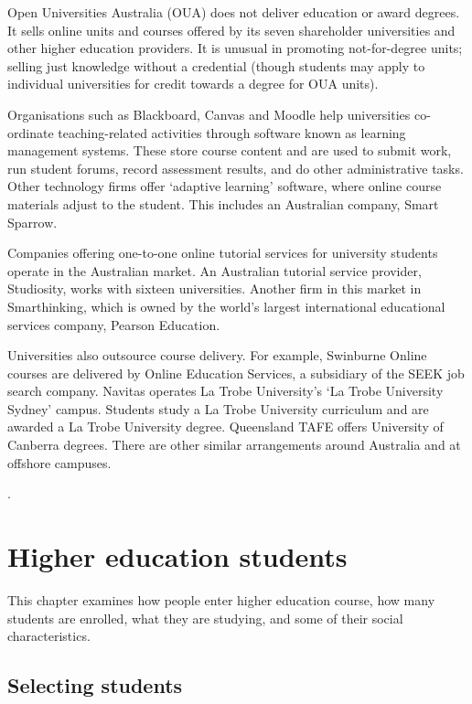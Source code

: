 \documentclass[]{book}
\begin{document}
Open Universities Australia (OUA) does not deliver education or award degrees. It sells online units and courses offered by its seven shareholder universities and other higher education providers. It is unusual in promoting not-for-degree units; selling just knowledge without a credential (though students may apply to individual universities for credit towards a degree for OUA units).

Organisations such as Blackboard, Canvas and Moodle help universities co-ordinate teaching-related activities through software known as learning management systems. These store course content and are used to submit work, run student forums, record assessment results, and do other administrative tasks. Other technology firms offer `adaptive learning' software, where online course materials adjust to the student. This includes an Australian company, Smart Sparrow.

Companies offering one-to-one online tutorial services for university students operate in the Australian market. An Australian tutorial service provider, Studiosity, works with sixteen universities. Another firm in this market in Smarthinking, which is owned by the world's largest international educational services company, Pearson Education.

Universities also outsource course delivery. For example, Swinburne Online courses are delivered by Online Education Services, a subsidiary of the SEEK job search company. Navitas operates La Trobe University's `La Trobe University Sydney' campus. Students study a La Trobe University curriculum and are awarded a La Trobe University degree. Queensland TAFE offers University of Canberra degrees. There are other similar arrangements around Australia and at offshore campuses.

.

\hypertarget{higher-education-students}{%
\chapter{Higher education students }\label{higher-education-students}}

This chapter examines how people enter higher education course, how many students are enrolled, what they are studying, and some of their social characteristics.

\hypertarget{selecting-students}{%
\section{Selecting students}\label{selecting-students}}
\end{document}
